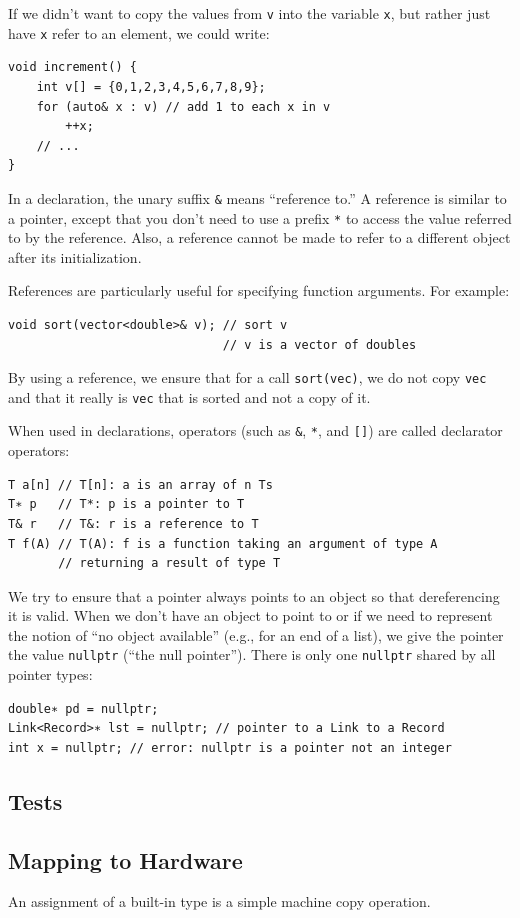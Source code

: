 \documentclass[11pt]{article}
\begin{document}
If we didn’t want to copy the values from \texttt{v} into the variable \texttt{x}, but rather just have \texttt{x} refer to
an element, we could write:
\begin{verbatim}
void increment() {
    int v[] = {0,1,2,3,4,5,6,7,8,9};
    for (auto& x : v) // add 1 to each x in v
        ++x;
    // ...
}
\end{verbatim}

In a declaration, the unary suffix \texttt{\&} means ``reference to.'' A reference is similar to a
pointer, except that you don't need to use a prefix \texttt{*} to access the value referred to by the
reference. Also, a reference cannot be made to refer to a different object after its
initialization.

References are particularly useful for specifying function arguments. For example:
\begin{verbatim}
void sort(vector<double>& v); // sort v
                              // v is a vector of doubles
\end{verbatim}
By using a reference, we ensure that for a call \texttt{sort(vec)}, we do not copy \texttt{vec} and that it really
is \texttt{vec} that is sorted and not a copy of it.

When used in declarations, operators (such as \texttt{\&}, \texttt{*}, and \texttt{[]}) are called declarator operators:
\begin{verbatim}
T a[n] // T[n]: a is an array of n Ts
T∗ p   // T*: p is a pointer to T
T& r   // T&: r is a reference to T
T f(A) // T(A): f is a function taking an argument of type A
       // returning a result of type T
\end{verbatim}

We try to ensure that a pointer always points to an object so that dereferencing it is valid.
When we don't have an object to point to or if we need to represent the notion of ``no object
available'' (e.g., for an end of a list), we give the pointer the value \texttt{nullptr} (``the null
pointer''). There is only one \texttt{nullptr} shared by all pointer types:
\begin{verbatim}
double∗ pd = nullptr;
Link<Record>∗ lst = nullptr; // pointer to a Link to a Record
int x = nullptr; // error: nullptr is a pointer not an integer
\end{verbatim}
\subsection{Tests}
\label{sec:org6576a11}
\subsection{Mapping to Hardware}
\label{sec:org022729b}
An assignment of a built-in type is a simple machine copy operation.
\end{document}

